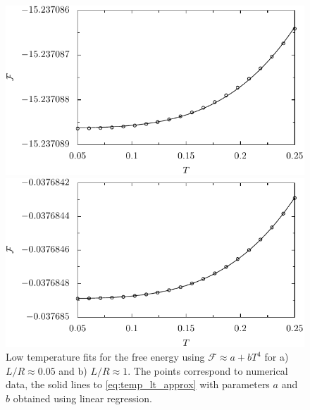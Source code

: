 \begin{figure}
  \begin{minipage}[b]{.5\linewidth}
  \centering
  \includegraphics[scale=0.7]{plots/lowT_fit/fits/fit_0_052718.pdf}
  \end{minipage}
  \begin{minipage}[b]{.5\linewidth}
  \centering
  \includegraphics[scale=0.7]{plots/lowT_fit/fits/fit_1_001202.pdf}
  \end{minipage}

  \caption{Low temperature fits for the free energy using $\mathcal{F}\approx
  a+bT^4$ for a) $L/R\approx0.05$ and b) $L/R\approx1$. The points correspond
  to numerical data, the solid lines to \eqref{eq:temp_lt_approx}
  with parameters $a$ and $b$ obtained using linear regression.}
  \label{fig:temp_lowT_fits}
\end{figure}


